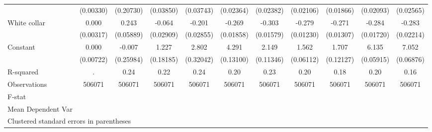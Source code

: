 {\begin{tabular}{l*{10}{c}}
                    &   (0.00330)         &   (0.20730)         &   (0.03850)         &   (0.03743)         &   (0.02364)         &   (0.02382)         &   (0.02106)         &   (0.01866)         &   (0.02093)         &   (0.02565)         \\
White collar        &       0.000         &       0.243\sym{***}&      -0.064\sym{*}  &      -0.201\sym{***}&      -0.269\sym{***}&      -0.303\sym{***}&      -0.279\sym{***}&      -0.271\sym{***}&      -0.284\sym{***}&      -0.283\sym{***}\\
                    &   (0.00317)         &   (0.05889)         &   (0.02909)         &   (0.02855)         &   (0.01858)         &   (0.01579)         &   (0.01230)         &   (0.01307)         &   (0.01720)         &   (0.02214)         \\
Constant            &       0.000         &      -0.007         &       1.227\sym{***}&       2.802\sym{***}&       4.291\sym{***}&       2.149\sym{***}&       1.562\sym{***}&       1.707\sym{***}&       6.135\sym{***}&       7.052\sym{***}\\
                    &   (0.00722)         &   (0.25984)         &   (0.18185)         &   (0.32042)         &   (0.13100)         &   (0.11346)         &   (0.06112)         &   (0.12127)         &   (0.05915)         &   (0.06876)         \\
\hline
R-squared           &           .         &        0.24         &        0.22         &        0.24         &        0.20         &        0.23         &        0.20         &        0.18         &        0.20         &        0.16         \\
Observations        &      506071         &      506071         &      506071         &      506071         &      506071         &      506071         &      506071         &      506071         &      506071         &      506071         \\
F-stat              &                     &                     &                     &                     &                     &                     &                     &                     &                     &                     \\
Mean Dependent Var  &                     &                     &                     &                     &                     &                     &                     &                     &                     &                     \\
\hline\hline
\multicolumn{11}{l}{\footnotesize Clustered standard errors in parentheses}\\
\end{tabular}
}
